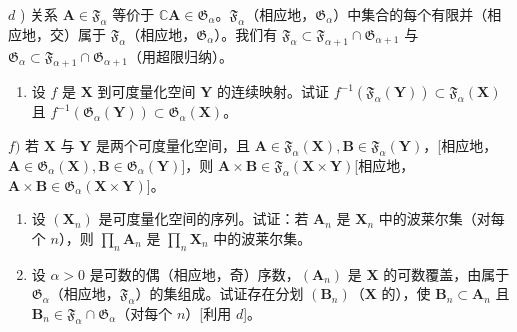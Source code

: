 \(d\) ) 关系 \(\mathbf{A}\in\mathfrak{F}_{\alpha}\) 等价于 \(\mathbb{C}\mathbf{A}\in\mathfrak{G}_{\alpha}\)。\(\mathfrak{F}_{\alpha}\)（相应地，\(\mathfrak{G}_{\alpha}\)）中集合的每个有限并（相应地，交）属于 \(\mathfrak{F}_{\alpha}\)（相应地，\(\mathfrak{G}_{\alpha}\)）。我们有 \(\mathfrak{F}_{\alpha}\subset\mathfrak{F}_{\alpha+1}\cap\mathfrak{G}_{\alpha+1}\) 与 \(\mathfrak{G}_{\alpha}\subset\mathfrak{F}_{\alpha+1}\cap\mathfrak{G}_{\alpha+1}\)（用超限归纳）。

\begin{enumerate}
\def\labelenumi{\alph{enumi})}
\setcounter{enumi}{4}
\tightlist
\item
  设 \(f\) 是 \(\mathbf{X}\) 到可度量化空间 \(\mathbf{Y}\) 的连续映射。试证 \(f^{-1}(\mathfrak{F}_{\alpha}(\mathbf{Y})) \subset \mathfrak{F}_{\alpha}(\mathbf{X})\) 且 \(f^{-1}(\mathfrak{G}_{\alpha}(\mathbf{Y})) \subset \mathfrak{G}_{\alpha}(\mathbf{X})\)。
\end{enumerate}

\(f)\) 若 \(\mathbf{X}\) 与 \(\mathbf{Y}\) 是两个可度量化空间，且 \(\mathbf{A} \in \mathfrak{F}_{\alpha}(\mathbf{X}), \mathbf{B} \in \mathfrak{F}_{\alpha}(\mathbf{Y})\)，{[}相应地，\(\mathbf{A} \in \mathfrak{G}_{\alpha}(\mathbf{X}), \mathbf{B} \in \mathfrak{G}_{\alpha}(\mathbf{Y})\){]}，则 \(\mathbf{A} \times \mathbf{B} \in \mathfrak{F}_{\alpha}(\mathbf{X} \times \mathbf{Y})\){[}相应地，\(\mathbf{A} \times \mathbf{B} \in \mathfrak{G}_{\alpha}(\mathbf{X} \times \mathbf{Y})\){]}。

\begin{enumerate}
\def\labelenumi{\alph{enumi})}
\setcounter{enumi}{6}
\item
  设 \((\mathbf{X}_n)\) 是可度量化空间的序列。试证：若 \(\mathbf{A}_n\) 是 \(\mathbf{X}_n\) 中的波莱尔集（对每个 \(n\)），则 \(\prod_{n} \mathbf{A}_n\) 是 \(\prod_{n} \mathbf{X}_n\) 中的波莱尔集。
\item
  设 \(\alpha > 0\) 是可数的偶（相应地，奇）序数，\((\mathbf{A}_n)\) 是 \(\mathbf{X}\) 的可数覆盖，由属于 \(\mathfrak{G}_{\alpha}\)（相应地，\(\mathfrak{F}_{\alpha}\)）的集组成。试证存在分划 \((\mathbf{B}_n)\)（\(\mathbf{X}\) 的），使 \(\mathbf{B}_n \subset \mathbf{A}_n\) 且 \(\mathbf{B}_n \in \mathfrak{F}_{\alpha} \cap \mathfrak{G}_{\alpha}\)（对每个 \(n\)）{[}利用 \(d\){]}。
\end{enumerate}

